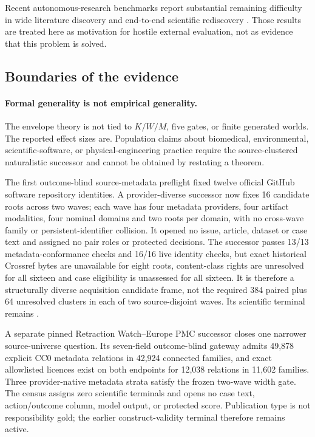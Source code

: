 Recent autonomous-research benchmarks report substantial remaining difficulty in
wide literature discovery and end-to-end scientific rediscovery
\cite{autoresearchbench2026,researchclawbench2026}. Those results are treated
here as motivation for hostile external evaluation, not as evidence that this
problem is solved.

\subsection{Boundaries of the evidence}

\paragraph{Formal generality is not empirical generality.}
The envelope theory is not tied to $K/W/M$, five gates, or finite generated
worlds. The reported effect sizes are. Population claims about biomedical,
environmental, scientific-software, or physical-engineering practice require
the source-clustered naturalistic successor and cannot be obtained by
restating a theorem.

The first outcome-blind source-metadata preflight fixed twelve official GitHub
software repository identities. A provider-diverse successor now fixes 16
candidate roots across two waves; each wave has four metadata providers, four
artifact modalities, four nominal domains and two roots per domain, with no
cross-wave family or persistent-identifier collision. It opened no issue,
article, dataset or case text and assigned no pair roles or protected
decisions. The successor passes 13/13 metadata-conformance checks and 16/16
live identity checks, but exact historical Crossref bytes are unavailable for
eight roots, content-class rights are unresolved for all sixteen and case
eligibility is unassessed for all sixteen. It is therefore a structurally
diverse acquisition candidate frame, not the required 384 paired plus 64
unresolved clusters in each of two source-disjoint waves. Its scientific
terminal remains
.

A separate pinned Retraction Watch--Europe PMC successor closes one narrower
source-universe question. Its seven-field outcome-blind gateway admits 49,878
explicit CC0 metadata relations in 42,924 connected families, and exact
allowlisted licences exist on both endpoints for 12,038 relations in 11,602
families. Three provider-native metadata strata satisfy the frozen two-wave
width gate. The census assigns zero scientific terminals and opens no case
text, action/outcome column, model output, or protected score. Publication type
is not responsibility gold; the earlier construct-validity terminal therefore
remains active.

